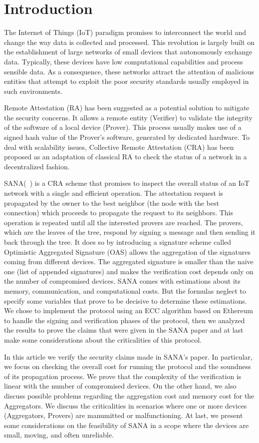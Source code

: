 \section{Introduction}

The Internet of Things (IoT) paradigm promises to interconnect the world and
change the way data is collected and processed.
This revolution is largely built on the establishment of large networks of small 
devices that autonomously exchange data.
Typically, these devices have low computational capabilities and process
sensible data.
As a consequence, these networks attract the attention of malicious entities
that attempt to exploit the poor security standards usually employed in such
environments.

Remote Attestation (RA) has been suggested as a potential solution to mitigate the
security concerns.
It allows a remote entity (\ie Verifier) to validate the integrity of
the software of a local device (\ie Prover).
This process usually makes use of a signed hash value of the Prover’s software, 
generated by dedicated hardware.
To deal with scalability issues, Collective Remote Attestation (CRA) has 
been proposed as an adaptation of classical RA to check the status of a network 
in a decentralized fashion.

SANA(~\cite{sana}) is a CRA scheme that promises to inspect the overall
status of an IoT network with a single and efficient operation.
The attestation request is propagated by the owner to the best neighbor (\ie the node with the best connection) which proceeds to propagate the request to its neighbors.
This operation is repeated until all the interested provers are reached.
The provers, which are the leaves of the tree, respond by signing a message and then sending it back through the tree.
It does so by introducing a signature scheme called Optimistic Aggregated
Signature (OAS) allows the aggregation of the signatures coming from
different devices.
The aggregated signature is smaller than the naive one (\ie list of appended
signatures) and makes the verification cost depends only on the number of
compromised devices.
SANA comes with estimations about its memory, communication, and computational costs. But the formulas neglect to specify some variables that prove to be decisive to determine these estimations.
We chose to implement the protocol using an ECC algorithm based on Ethereum to handle the signing and verification phases of the protocol, then we analyzed the results to prove the claims that were given in the SANA paper and at last make some considerations about the criticalities of this protocol.

In this article we verify the security claims made in SANA's paper.
In particular, we focus on checking the overall cost for running the protocol
and the soundness of its propagation process.
We prove that the complexity of the verification is linear with the number of compromised devices.
On the other hand, we also discuss possible problems regarding the aggregation cost and memory cost for the Aggregators.
We discuss the criticalities in scenarios where one or more devices (\eg Aggregators, Provers) are manumitted or malfunctioning.
At last, we present some considerations on the feasibility of SANA in a scope where the devices are small, moving, and often unreliable.